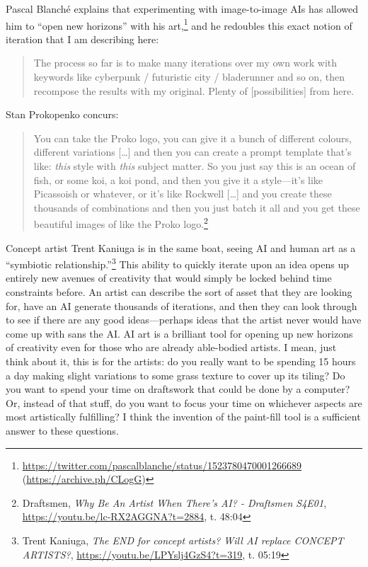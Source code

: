 \documentclass[11pt]{article}
\begin{document}
Pascal Blanché explains that experimenting with image-to-image AIs has allowed him to ``open new horizons'' with his art,\footnote{\url{https://twitter.com/pascalblanche/status/1523780470001266689} (\url{https://archive.ph/CLogG})} and he redoubles this exact notion of iteration that I am describing here:
\begin{quote}
The process so far is to make many iterations over my own work with keywords like cyberpunk / futuristic city / bladerunner and so on, then recompose the results with my original. Plenty of [possibilities] from here.
\end{quote}

Stan Prokopenko concurs:
\begin{quote}
You can take the Proko logo, you can give it a bunch of different colours, different variations [\ldots{}] and then you can create a prompt template that's like: \emph{this} style with \emph{this} subject matter. So you just say this is an ocean of fish, or some koi, a koi pond, and then you give it a style---it's like Picassoish or whatever, or it's like Rockwell [\ldots{}] and you create these thousands of combinations and then you just batch it all and you get these beautiful images of like the Proko logo.\footnote{Draftsmen, \emph{Why Be An Artist When There's AI? - Draftsmen S4E01}, \url{https://youtu.be/lc-RX2AGGNA?t=2884}, t. 48:04}
\end{quote}

Concept artist Trent Kaniuga is in the same boat, seeing AI and human art as a ``symbiotic relationship.''\footnote{Trent Kaniuga, \emph{The END for concept artists? Will AI replace CONCEPT ARTISTS?}, \url{https://youtu.be/LPYslj4GzS4?t=319}, t. 05:19} This ability to quickly iterate upon an idea opens up entirely new avenues of creativity that would simply be locked behind time constraints before. An artist can describe the sort of asset that they are looking for, have an AI generate thousands of iterations, and then they can look through to see if there are any good ideas---perhaps ideas that the artist never would have come up with sans the AI. AI art is a brilliant tool for opening up new horizons of creativity even for those who are already able-bodied artists. I mean, just think about it, this is for the artists: do you really want to be spending 15 hours a day making slight variations to some grass texture to cover up its tiling? Do you want to spend your time on draftswork that could be done by a computer? Or, instead of that stuff, do you want to focus your time on whichever aspects are most artistically fulfilling? I think the invention of the paint-fill tool is a sufficient answer to these questions.
\end{document}
